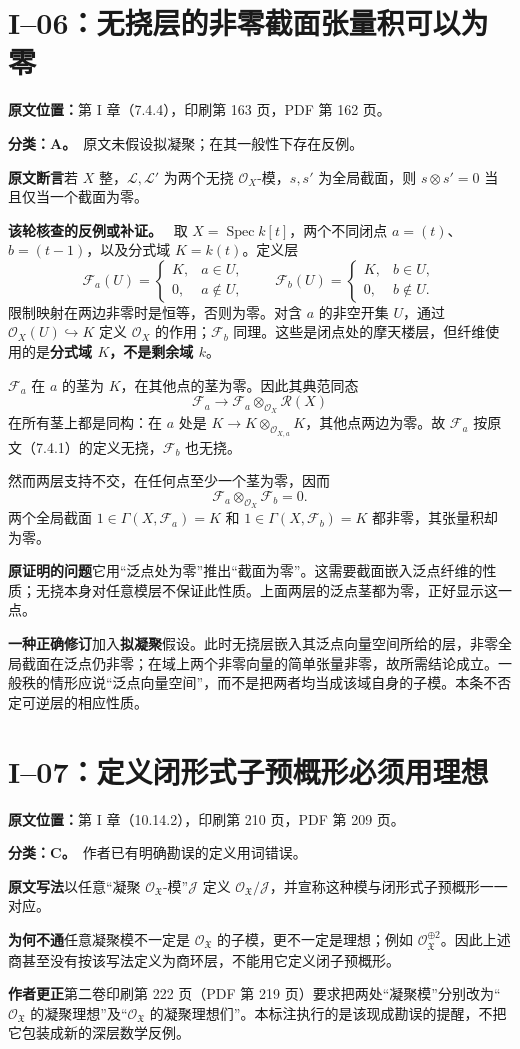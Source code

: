 \documentclass[UTF8,a4paper]{ctexbook}
\newcommand{\OO}{\mathscr O}
\DeclareMathOperator{\Spec}{Spec}
\newcommand{\RR}{\mathcal R}
\newcommand{\FF}{\mathcal F}
\newcommand{\JJ}{\mathcal J}
\newcommand{\oldauditsrc}[1]{\par\noindent\textbf{原文位置：}#1。\par}
\newcommand{\kind}[2]{\noindent\textbf{分类：#1。}\ #2\par}
\newcommand{\lead}[1]{\par\noindent\textbf{#1}\quad}
\newenvironment{analysisproof}{\par\noindent\textbf{该轮核查的反例或补证。}\ }{\par}
\begin{document}
\section{I--06：无挠层的非零截面张量积可以为零}
\oldauditsrc{第 I 章（7.4.4），印刷第 163 页，PDF 第 162 页}
\kind{A}{原文未假设拟凝聚；在其一般性下存在反例。}
\lead{原文断言}若 $X$ 整，$\mathcal L,\mathcal L'$ 为两个无挠 $\OO_X$-模，$s,s'$ 为全局截面，则 $s\otimes s'=0$ 当且仅当一个截面为零。
\begin{analysisproof}
取 $X=\Spec k[t]$，两个不同闭点 $a=(t)$、$b=(t-1)$，以及分式域 $K=k(t)$。定义层
\[
\FF_a(U)=\begin{cases}K,&a\in U,\\0,&a\notin U,\end{cases}
\qquad
\FF_b(U)=\begin{cases}K,&b\in U,\\0,&b\notin U.\end{cases}
\]
限制映射在两边非零时是恒等，否则为零。对含 $a$ 的非空开集 $U$，通过 $\OO_X(U)\hookrightarrow K$ 定义 $\OO_X$ 的作用；$\FF_b$ 同理。这些是闭点处的摩天楼层，但纤维使用的是\textbf{分式域 $K$，不是剩余域 $k$}。

$\FF_a$ 在 $a$ 的茎为 $K$，在其他点的茎为零。因此其典范同态
\[
\FF_a\longrightarrow\FF_a\otimes_{\OO_X}\RR(X)
\]
在所有茎上都是同构：在 $a$ 处是 $K\to K\otimes_{\OO_{X,a}}K$，其他点两边为零。故 $\FF_a$ 按原文（7.4.1）的定义无挠，$\FF_b$ 也无挠。

然而两层支持不交，在任何点至少一个茎为零，因而
\[
\FF_a\otimes_{\OO_X}\FF_b=0.
\]
两个全局截面 $1\in\Gamma(X,\FF_a)=K$ 和 $1\in\Gamma(X,\FF_b)=K$ 都非零，其张量积却为零。
\end{analysisproof}
\lead{原证明的问题}它用“泛点处为零”推出“截面为零”。这需要截面嵌入泛点纤维的性质；无挠本身对任意模层不保证此性质。上面两层的泛点茎都为零，正好显示这一点。
\lead{一种正确修订}加入\textbf{拟凝聚}假设。此时无挠层嵌入其泛点向量空间所给的层，非零全局截面在泛点仍非零；在域上两个非零向量的简单张量非零，故所需结论成立。一般秩的情形应说“泛点向量空间”，而不是把两者均当成该域自身的子模。本条不否定可逆层的相应性质。

\section{I--07：定义闭形式子预概形必须用理想}
\oldauditsrc{第 I 章（10.14.2），印刷第 210 页，PDF 第 209 页}
\kind{C}{作者已有明确勘误的定义用词错误。}
\lead{原文写法}以任意“凝聚 $\OO_{\mathfrak X}$-模”$\JJ$ 定义 $\OO_{\mathfrak X}/\JJ$，并宣称这种模与闭形式子预概形一一对应。
\lead{为何不通}任意凝聚模不一定是 $\OO_{\mathfrak X}$ 的子模，更不一定是理想；例如 $\OO_{\mathfrak X}^{\oplus2}$。因此上述商甚至没有按该写法定义为商环层，不能用它定义闭子预概形。
\lead{作者更正}第二卷印刷第 222 页（PDF 第 219 页）要求把两处“凝聚模”分别改为“$\OO_{\mathfrak X}$ 的凝聚理想”及“$\OO_{\mathfrak X}$ 的凝聚理想们”。本标注执行的是该现成勘误的提醒，不把它包装成新的深层数学反例。
\end{document}
